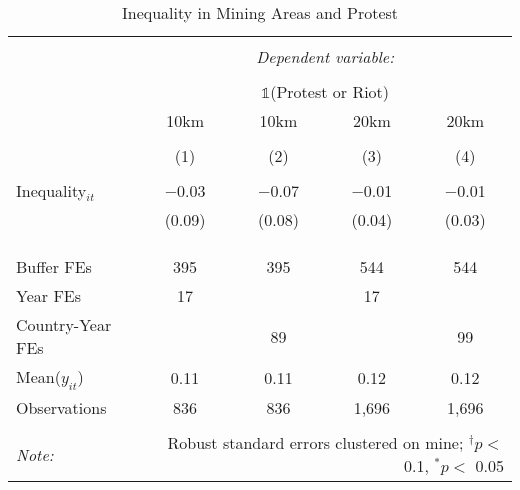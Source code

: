 
\begin{table}[ht!] \centering 
  \caption{Inequality in Mining Areas and Protest} 
  \label{tab:did_dhs_inequality_protest} 
\begin{tabular}{@{\extracolsep{0pt}}lcccc} 
\\[-1.8ex]\hline 
\hline \\[-1.8ex] 
 & \multicolumn{4}{c}{\textit{Dependent variable:}} \\ 
\cline{2-5} 
\\[-1.8ex] & \multicolumn{4}{c}{$\mathbb{1}$(Protest or Riot)} \\ 
 & 10km & 10km & 20km & 20km \\ 
\\[-1.8ex] & (1) & (2) & (3) & (4)\\ 
\hline \\[-1.8ex] 
 Inequality$_{it}$ & $-$0.03 & $-$0.07 & $-$0.01 & $-$0.01 \\ 
  & (0.09) & (0.08) & (0.04) & (0.03) \\ 
  & & & & \\ 
\hline \\[-1.8ex] 
\hline \\[-1.8ex] Buffer FEs & 395 & 395 & 544 & 544 \\ 
Year FEs & 17 &  & 17 &  \\ 
Country-Year FEs &  & 89 &  & 99 \\ 
Mean($y_{it}$) & 0.11 & 0.11 & 0.12 & 0.12 \\ 
Observations & 836 & 836 & 1,696 & 1,696 \\ 
\hline 
\hline \\[-1.8ex] 
\textit{Note:}  & \multicolumn{4}{r}{Robust standard errors clustered on mine; $^{\dagger} p <$ 0.1, $^*p <$ 0.05} \\ 
\end{tabular} 
\end{table} 
